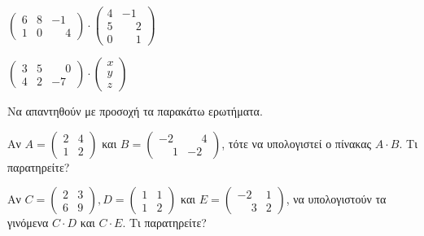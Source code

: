 \documentclass[a4paper,12pt]{article}
\begin{document}
\begin{outline}[enumerate]
\2 $\begin{pmatrix}
6 & 8 & -1 \\
1 & 0 & \phantom{-}4
\end{pmatrix}\cdot 
\begin{pmatrix}
4 & -1 \\
5 & \phantom{-}2 \\
0 & \phantom{-}1 
\end{pmatrix}
$

\2 $\begin{pmatrix}
3 & 5 & \phantom{-}0 \\
4 & 2 & -7
\end{pmatrix}\cdot 
\begin{pmatrix}
x\\
y\\
z
\end{pmatrix}
$

\1 Να απαντηθούν με προσοχή τα παρακάτω ερωτήματα. 

\2 Αν $Α=\begin{pmatrix}
2 & 4\\
1 & 2
\end{pmatrix}$ και $Β=\begin{pmatrix}
-2 & \phantom{-}4 \\
\phantom{-}1 & -2
\end{pmatrix}$, τότε να υπολογιστεί ο πίνακας $A\cdot B$. Τι παρατηρείτε?

\2 Αν $C=\begin{pmatrix}
2 & 3 \\
6 & 9
\end{pmatrix}, D=\begin{pmatrix}
1 & 1 \\
1 & 2 
\end{pmatrix}$ και $E=\begin{pmatrix}
-2 & 1 \\
\phantom{-}3 & 2
\end{pmatrix}
$, να υπολογιστούν τα γινόμενα $C\cdot D$ και $C\cdot E$. Τι παρατηρείτε?


\end{outline}
\end{document}

